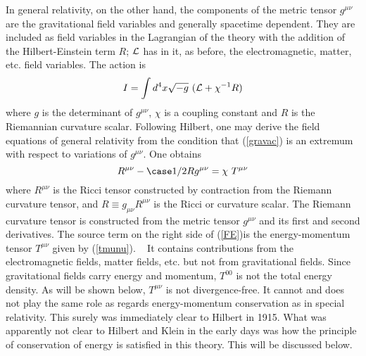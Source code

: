   
In general relativity, on the other hand, the components of the metric tensor $g^{\mu\nu}$
 are the gravitational field variables and generally  spacetime dependent.
They are included as field variables in  
the Lagrangian of the theory with the addition of the Hilbert-Einstein term $R$;
  ${\cal{L}}$  has in it, as before, the electromagnetic, matter, etc. field variables.
The action is 
\begin{equation}
I =  \int d^4x \sqrt{-g} ~( {\cal{L}} + \chi^{-1}R )  \label{gravac}
\end{equation}
where $g$ is the determinant of $g^{\mu\nu}$, $\chi$ is a
coupling constant and 
$R$ is the Riemannian curvature scalar.
Following Hilbert, one may derive  the field equations of
general relativity from the condition that  (\ref{gravac}) is
 an extremum
with respect to variations of  $g^{\mu\nu}$. One obtains 
\begin{equation} 
R^{\mu\nu} - \case 1/2Rg^{\mu\nu} = \chi ~
T^{\mu\nu} \label{FE} 
\end{equation}
where $R^{\mu\nu}$ is the Ricci tensor constructed by contraction from 
the Riemann curvature tensor,
and $R \equiv g_{\mu\nu}R^{\mu\nu} $ is the Ricci or curvature scalar.  
 The Riemann
curvature tensor is constructed from the metric tensor $g^{\mu\nu}$ and its first and second
derivatives.  The source term
on the right  side of (\ref{FE})is the  
 energy-momentum tensor $T^{\mu\nu}$ given by  (\ref{tmunu}).
\cite{c&w}~ It contains contributions from the
electromagnetic fields, matter fields, etc. but not from gravitational fields.
Since gravitational fields carry energy and momentum,
 $T^{00}$ is not  the total energy density. As will be shown below,
 $T^{\mu\nu}$ is not divergence-free. 
 It cannot and does not play the same role as regards
energy-momentum conservation as  in special relativity.   This surely was 
immediately clear to Hilbert in 1915. What was apparently not clear 
to Hilbert and Klein in the early days was
how the principle of conservation of energy is satisfied in this theory. This will be discussed below.


